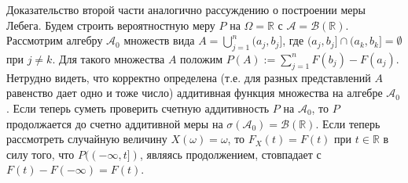 Доказательство второй части аналогично рассуждению о построении меры Лебега.
Будем строить вероятностную меру $P$ на $\Omega = \mathbb{R}$ с $\mathcal{A} = \mathcal{B}(\mathbb{R})$.
Рассмотрим алгебру $\mathcal{A}_0$ множеств вида $A = \bigcup\limits_{j = 1}^n (a_j, b_j]$, где $(a_j, b_j] \cap (a_k, b_k] = \emptyset$ при $j \neq k$.
Для такого множества $A$ положим $P(A) := \sum\limits_{j = 1}^{n} F(b_j) - F(a_j)$.
Нетрудно видеть, что корректно определена (т.е. для разных представлений $A$ равенство дает одно и тоже число) аддитивная функция множества на алгебре $\mathcal{A}_0$.
Если теперь суметь проверить счетную аддитивность $P$ на $\mathcal{A}_0$, то $P$ продолжается до счетно аддитивной меры на $\sigma(\mathcal{A}_0) = \mathcal{B}(\mathbb{R})$.
Если теперь рассмотреть случайную величину $X(\omega)=\omega$, то $F_X(t) = F(t)$ при $t\in \mathbb{R}$ в силу того, что $P((-\infty, t])$, являясь продолжением, стовпадает с $F(t)-F(-\infty) = F(t)$.